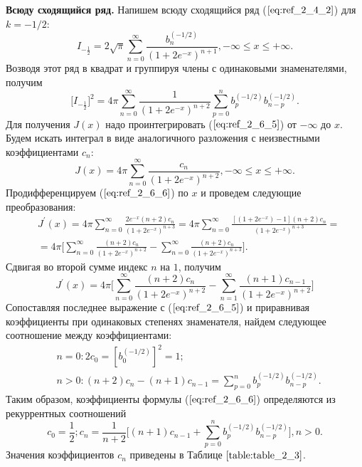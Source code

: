\textbf{Всюду сходящийся ряд.} Напишем всюду сходящийся ряд ($\ref{eq:ref_2_4_2}$) для $k = -1/2$:
\begin{equation}
I_{-\frac{1}{2}} = 2\sqrt{\pi} \sum\limits_{n=0}^{\infty} \frac{b_n^{(-1/2)}}{(1+2e^{-x})^{n+1}}, -\infty \leqslant x \leqslant +\infty.
\label{eq:ref_2_6_4}
\end{equation}
Возводя этот ряд в квадрат и группируя члены с одинаковыми знаменателями, получим
\begin{equation}
\bigg[I_{-\frac{1}{2}} \bigg]^2 = 4\pi \sum\limits_{n=0}^{\infty} \frac{1}{(1+2e^{-x})^{n+2}} \sum\limits_{p=0}^n b_p^{(-1/2)} b_{n-p}^{(-1/2)}.
\label{eq:ref_2_6_5}
\end{equation}
Для получения $J(x)$ надо проинтегрировать ($\ref{eq:ref_2_6_5}$) от $-\infty$ до $x$. Будем искать
интеграл в виде аналогичного разложения с неизвестными коэффициентами $c_n$:
\begin{equation}
J(x)=4\pi \sum_{n=0}^{\infty} \frac{c_n}{(1+2e^{-x})^{n+2}}, -\infty \leqslant x \leqslant +\infty.
\label{eq:ref_2_6_6}
\end{equation}
Продифференцируем ($\ref{eq:ref_2_6_6}$) по $x$ и проведем следующие преобразования:
\begin{equation}
\begin{aligned}
&J^{'}(x) = 4\pi \sum\limits_{n=0}^{\infty} \frac{2e^{-x}(n+2)c_n}{(1+2e^{-x})^{n+3}} = 4\pi \sum\limits_{n=0}^{\infty} \frac{[(1+2e^{-x}) - 1](n+2)c_n}{(1+2e^{-x})^{n+3}} = \\
&= 4\pi \Bigg[ \sum\limits_{n=0}^{\infty} \frac{(n+2)c_n}{(1+2e^{-x})^{n+2}} - \sum\limits_{n=0}^{\infty} \frac{(n+2)c_n}{(1+2e^{-x})^{n+3}} \Bigg].
\end{aligned}
\label{eq:ref_2_6_7}
\end{equation}
Сдвигая во второй сумме индекс $n$ на $1$, получим
\begin{equation}
J^{'}(x) = 4\pi \Bigg[ \sum\limits_{n=0}^{\infty} \frac{(n+2)c_n}{(1+2e^{-x})^{n+2}} - \sum\limits_{n=1}^{\infty} \frac{(n+1)c_{n-1}}{(1+2e^{-x})^{n+2}}\Bigg]
\label{eq:ref_2_6_8}
\end{equation}
Сопоставляя последнее выражение с ($\ref{eq:ref_2_6_5}$) и приравнивая коэффициенты при
одинаковых степенях знаменателя, найдем следующее соотношение между
коэффициентами:
\begin{equation}
\begin{aligned}
&n=0: 2c_0 = [b_0^{(-1/2)}]^2 = 1;\\
&n>0: (n+2)c_n - (n+1)c_{n-1} = \sum\limits_{p=0}^n b_p^{(-1/2)}b_{n-p}^{(-1/2)}.
\end{aligned}
\label{eq:ref_2_6_9}
\end{equation}
Таким образом, коэффициенты формулы ($\ref{eq:ref_2_6_6}$) определяются из рекуррентных соотношений
\begin{equation}
c_0 = \frac{1}{2}; c_n = \frac{1}{n+2} \Bigg[ (n+1)c_{n-1} + \sum\limits_{p=0}^n b_p^{(-1/2)}b_{n-p}^{(-1/2)} \Bigg], n > 0.
\label{eq:ref_2_6_10}
\end{equation}
Значения коэффициентов $c_n$ приведены в Таблице $\ref{table:table_2_3}$.

